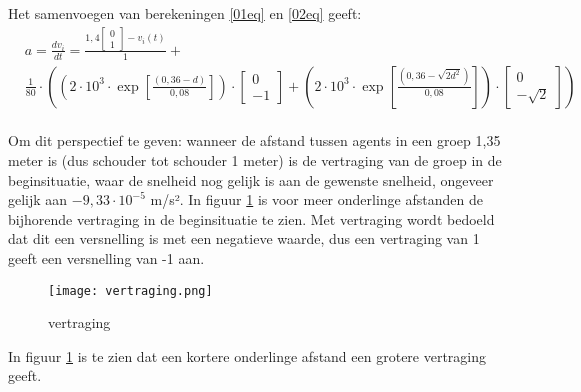 \documentclass[12pt, letterpaper]{article}
\begin{document}
Het samenvoegen van berekeningen \ref{01eq} en \ref{02eq} geeft: 
\begin{equation}
    \begin{aligned}
        &a= \frac{d v_{i}}{d t} = \frac{1,4 [ \begin{smallmatrix}  0 \\ 1 \end{smallmatrix} ]- v_{i}(t)}{1} + \\& \frac{1}{80} \cdot\left(\left(2 \cdot 10^{3} \cdot \exp     \left[\frac{(0,36-d)}{0,08}\right]\right)     \cdot\left[\begin{array}{c}
            0 \\
            -1
        \end{array}\right]+\left(2 \cdot 10^{3} \cdot \exp  \left[\frac{\left(0,36-\sqrt{2             d^{2}}\right)}{0,08}\right]\right)             \cdot\left[\begin{array}{c}
            0 \\
            -\sqrt{2}
        \end{array}\right]\right)
    \end{aligned}
\end{equation}
\\
Om dit perspectief te geven: wanneer de afstand tussen agents in een groep 1,35 meter is (dus schouder tot schouder 1 meter) is de vertraging van de groep in de beginsituatie, waar de snelheid nog gelijk is aan de gewenste snelheid, ongeveer gelijk aan $-9,33 \cdot 10^{-5}$ m/s². In figuur \ref{versnelling} is voor meer onderlinge afstanden de bijhorende vertraging in de beginsituatie te zien. Met vertraging wordt bedoeld dat dit een versnelling is met een negatieve waarde, dus een vertraging van 1 geeft een versnelling van -1 aan.
\begin{figure}[H]
\centering
\texttt{[image: vertraging.png]}
\caption{vertraging}
\label{versnelling}
\end{figure}

\noindent In figuur \ref{versnelling} is te zien dat een kortere onderlinge afstand een grotere vertraging geeft. 
\end{document}
